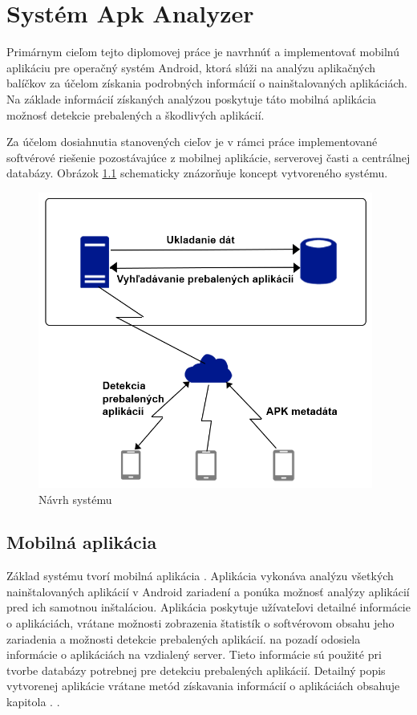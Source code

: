 \chapter{Systém Apk Analyzer}
\label{chap:apk-analyzer}

Primárnym cieľom tejto diplomovej práce je navrhnúť a implementovať mobilnú aplikáciu pre operačný systém Android, ktorá slúži na analýzu aplikačných balíčkov za účelom získania podrobných informácií o nainštalovaných aplikáciách. Na základe informácií získaných analýzou poskytuje táto mobilná aplikácia možnosť detekcie prebalených a škodlivých aplikácií. 

Za účelom dosiahnutia stanovených cieľov je v rámci práce implementované softvérové riešenie pozostávajúce z mobilnej aplikácie, serverovej časti a centrálnej databázy. Obrázok \ref{fig:systémApkAnalyzer} schematicky znázorňuje koncept vytvoreného systému.

\begin{figure}[htb]
  \begin{center}
    \includegraphics[width=110mm]{images/system-overview.png}
  \end{center}
  \caption{Návrh systému }
  \label{fig:systémApkAnalyzer}
\end{figure}

\section{Mobilná aplikácia}
Základ systému tvorí mobilná aplikácia . Aplikácia vykonáva analýzu všetkých nainštalovaných aplikácií v Android zariadení a ponúka možnosť analýzy aplikácií pred ich samotnou inštaláciou. Aplikácia poskytuje užívateľovi detailné informácie o aplikáciách, vrátane možnosti zobrazenia štatistík o softvérovom obsahu jeho zariadenia a možnosti detekcie prebalených aplikácií.  na pozadí odosiela informácie o aplikáciách na vzdialený server. Tieto informácie sú použité pri tvorbe databázy potrebnej pre detekciu prebalených aplikácií. Detailný popis vytvorenej aplikácie vrátane metód získavania informácií o aplikáciách obsahuje kapitola \label{chap:mobilna-aplikacia}.
.

